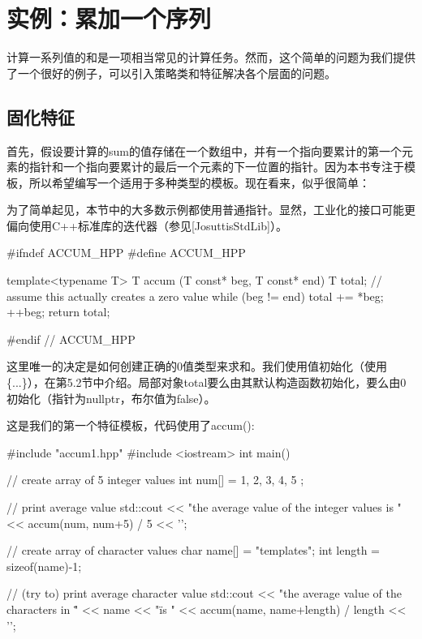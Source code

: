 \section{实例：累加一个序列}

计算一系列值的和是一项相当常见的计算任务。然而，这个简单的问题为我们提供了一个很好的例子，可以引入策略类和特征解决各个层面的问题。

\subsection{固化特征}

首先，假设要计算的sum的值存储在一个数组中，并有一个指向要累计的第一个元素的指针和一个指向要累计的最后一个元素的下一位置的指针。因为本书专注于模板，所以希望编写一个适用于多种类型的模板。现在看来，似乎很简单：

\begin{notice}
为了简单起见，本节中的大多数示例都使用普通指针。显然，工业化的接口可能更偏向使用C++标准库的迭代器（参见[JosuttisStdLib]）。
\end{notice}

\begin{cpp}
#ifndef ACCUM_HPP
#define ACCUM_HPP

template<typename T>
T accum (T const* beg, T const* end) {
	T total{}; // assume this actually creates a zero value
	while (beg != end) {
		total += *beg;
		++beg;
	}
	return total;
}

#endif // ACCUM_HPP
\end{cpp}

这里唯一的决定是如何创建正确的0值类型来求和。我们使用值初始化（使用\{...\}），在第5.2节中介绍。局部对象total要么由其默认构造函数初始化，要么由0初始化（指针为nullptr，布尔值为false）。

这是我们的第一个特征模板，代码使用了accum():

\begin{cpp}
#include "accum1.hpp"
#include <iostream>
int main() {
	// create array of 5 integer values
	int num[] = { 1, 2, 3, 4, 5 };
	
	// print average value
	std::cout << "the average value of the integer values is "
			  << accum(num, num+5) / 5
			  << '\n';
			  
	// create array of character values
	char name[] = "templates";
	int length = sizeof(name)-1;
	
	// (try to) print average character value
	std::cout << "the average value of the characters in \""
			  << name << "\" is "
			  << accum(name, name+length) / length
			  << '\n';
}
\end{cpp}

